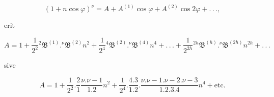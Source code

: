 \[
(1+n\cos\varphi)^{\nu} = A + A^{(1)}\cos\varphi + A^{(2)}\cos 2\varphi + .\,.\,.,
\]

\noindent erit

\[
A = 1 + \frac{1}{2^{2}} {}^{2}\mathfrak{B}^{(1)}  .  {}^{\nu}\mathfrak{B}^{(2)} n^{2} + \frac{1}{2^{4}} {}^{4}\mathfrak{B}^{(2)}  .  {}^{\nu}\mathfrak{B}^{(4)} n^{4} + .\,.\,. + \frac{1}{2^{2h}} {}^{2h}\mathfrak{B}^{(h)}  .  {}^{\nu}\mathfrak{B}^{(2h)} n^{2h} + .\,.\,.
\]

\noindent sive

\[
A = 1 + \frac{1}{2^{2}}  .  \frac{2}{1} \frac{\nu.\nu-1}{1.2} n^{2} + \frac{1}{2^{4}}  .  \frac{4.3}{1.2}  .  \frac{\nu.\nu-1.\nu-2.\nu-3}{1.2.3.4} n^{4} + \text{etc.}
\]
